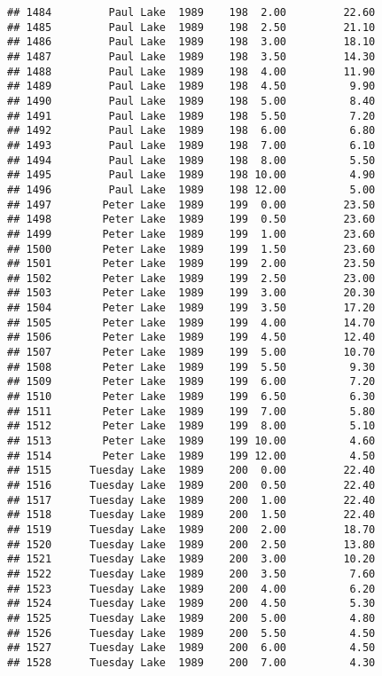 \documentclass[
]{article}
\begin{document}
\begin{verbatim}
## 1484         Paul Lake  1989    198  2.00         22.60
## 1485         Paul Lake  1989    198  2.50         21.10
## 1486         Paul Lake  1989    198  3.00         18.10
## 1487         Paul Lake  1989    198  3.50         14.30
## 1488         Paul Lake  1989    198  4.00         11.90
## 1489         Paul Lake  1989    198  4.50          9.90
## 1490         Paul Lake  1989    198  5.00          8.40
## 1491         Paul Lake  1989    198  5.50          7.20
## 1492         Paul Lake  1989    198  6.00          6.80
## 1493         Paul Lake  1989    198  7.00          6.10
## 1494         Paul Lake  1989    198  8.00          5.50
## 1495         Paul Lake  1989    198 10.00          4.90
## 1496         Paul Lake  1989    198 12.00          5.00
## 1497        Peter Lake  1989    199  0.00         23.50
## 1498        Peter Lake  1989    199  0.50         23.60
## 1499        Peter Lake  1989    199  1.00         23.60
## 1500        Peter Lake  1989    199  1.50         23.60
## 1501        Peter Lake  1989    199  2.00         23.50
## 1502        Peter Lake  1989    199  2.50         23.00
## 1503        Peter Lake  1989    199  3.00         20.30
## 1504        Peter Lake  1989    199  3.50         17.20
## 1505        Peter Lake  1989    199  4.00         14.70
## 1506        Peter Lake  1989    199  4.50         12.40
## 1507        Peter Lake  1989    199  5.00         10.70
## 1508        Peter Lake  1989    199  5.50          9.30
## 1509        Peter Lake  1989    199  6.00          7.20
## 1510        Peter Lake  1989    199  6.50          6.30
## 1511        Peter Lake  1989    199  7.00          5.80
## 1512        Peter Lake  1989    199  8.00          5.10
## 1513        Peter Lake  1989    199 10.00          4.60
## 1514        Peter Lake  1989    199 12.00          4.50
## 1515      Tuesday Lake  1989    200  0.00         22.40
## 1516      Tuesday Lake  1989    200  0.50         22.40
## 1517      Tuesday Lake  1989    200  1.00         22.40
## 1518      Tuesday Lake  1989    200  1.50         22.40
## 1519      Tuesday Lake  1989    200  2.00         18.70
## 1520      Tuesday Lake  1989    200  2.50         13.80
## 1521      Tuesday Lake  1989    200  3.00         10.20
## 1522      Tuesday Lake  1989    200  3.50          7.60
## 1523      Tuesday Lake  1989    200  4.00          6.20
## 1524      Tuesday Lake  1989    200  4.50          5.30
## 1525      Tuesday Lake  1989    200  5.00          4.80
## 1526      Tuesday Lake  1989    200  5.50          4.50
## 1527      Tuesday Lake  1989    200  6.00          4.50
## 1528      Tuesday Lake  1989    200  7.00          4.30

\end{verbatim}
\end{document}
